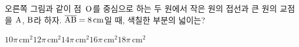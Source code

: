 \noindent\begin{minipage}[t]{0.58\linewidth}\vspace{0pt}\raggedright 오른쪽 그림과 같이 점~$\mathrm{O}$를 중심으로 하는 두 원에서 작은 원의 접선과 큰 원의 교점을 $\mathrm{A}$, $\mathrm{B}$라 하자. $\overline{\mathrm{AB}}=8\,\mathrm{cm}$일 때, 색칠한 부분의 넓이는?\end{minipage}\hfill\begin{minipage}[t]{0.4\linewidth}\vspace{0pt}\centering \resizebox{\ifdim\width>\linewidth\linewidth\else\width\fi}{!}{}\end{minipage}\par
\begin{choices32}{$10\pi\,\mathrm{cm}^2$}{$12\pi\,\mathrm{cm}^2$}{$14\pi\,\mathrm{cm}^2$}{$16\pi\,\mathrm{cm}^2$}{$18\pi\,\mathrm{cm}^2$}\end{choices32}
